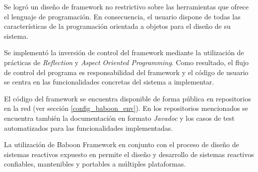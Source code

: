 Se logró un diseño de framework no restrictivo sobre las herramientas
que ofrece el lenguaje de programación. En consecuencia, el usuario dispone
de todas las características de la programación orientada a objetos para el
diseño de su sistema.

Se implementó la inversión de control del framework mediante la utilización de
prácticas de \textit{Reflection} y \textit{Aspect Oriented Programming}. Como
resultado, el flujo de control del programa es responsabilidad del framework y
el código de usuario se centra en las funcionalidades concretas del sistema a implementar.

El código del framework se encuentra disponible de forma pública en repositorios
en la red (ver sección \ref{config_baboon_env}). En los repositorios mencionados
se encuentra también la documentación en formato \textit{Javadoc} y los casos de
test automatizados para las funcionalidades implementadas.

La utilización de Baboon Framework en conjunto con el proceso de diseño de
sistemas reactivos expuesto en \cite{Bentivegna-Ludemann} permite el diseño y
desarrollo de sistemas reactivos confiables, mantenibles y portables a
múltiples plataformas.
